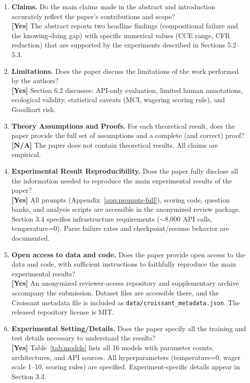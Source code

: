 \documentclass[10pt]{article}
\begin{document}
\begin{enumerate}

\item \textbf{Claims.} Do the main claims made in the abstract and introduction accurately reflect the paper's contributions and scope?
\\\textbf{[Yes]} The abstract reports two headline findings (compositional failure and the knowing-doing gap) with specific numerical values (CCE range, CFR reduction) that are supported by the experiments described in Sections 5.2--5.3.

\item \textbf{Limitations.} Does the paper discuss the limitations of the work performed by the authors?
\\\textbf{[Yes]} Section 6.2 discusses: API-only evaluation, limited human annotations, ecological validity, statistical caveats (MCI, wagering scoring rule), and Goodhart risk.

\item \textbf{Theory Assumptions and Proofs.} For each theoretical result, does the paper provide the full set of assumptions and a complete (and correct) proof?
\\\textbf{[N/A]} The paper does not contain theoretical results. All claims are empirical.

\item \textbf{Experimental Result Reproducibility.} Does the paper fully disclose all the information needed to reproduce the main experimental results of the paper?
\\\textbf{[Yes]} All prompts (Appendix~\ref{app:prompts-full}), scoring code, question banks, and analysis scripts are accessible in the anonymized review package. Section 3.4 specifies infrastructure requirements ($\sim$8{,}000 API calls, temperature=0). Parse failure rates and checkpoint/resume behavior are documented.

\item \textbf{Open access to data and code.} Does the paper provide open access to the data and code, with sufficient instructions to faithfully reproduce the main experimental results?
\\\textbf{[Yes]} An anonymized reviewer-access repository and supplementary archive accompany the submission. Dataset files are accessible there, and the Croissant metadata file is included as \texttt{data/croissant\_metadata.json}. The released repository license is MIT.

\item \textbf{Experimental Setting/Details.} Does the paper specify all the training and test details necessary to understand the results?
\\\textbf{[Yes]} Table~\ref{tab:models} lists all 16 models with parameter counts, architectures, and API sources. All hyperparameters (temperature=0, wager scale 1--10, scoring rules) are specified. Experiment-specific details appear in Section 3.3.


\end{enumerate}
\end{document}
